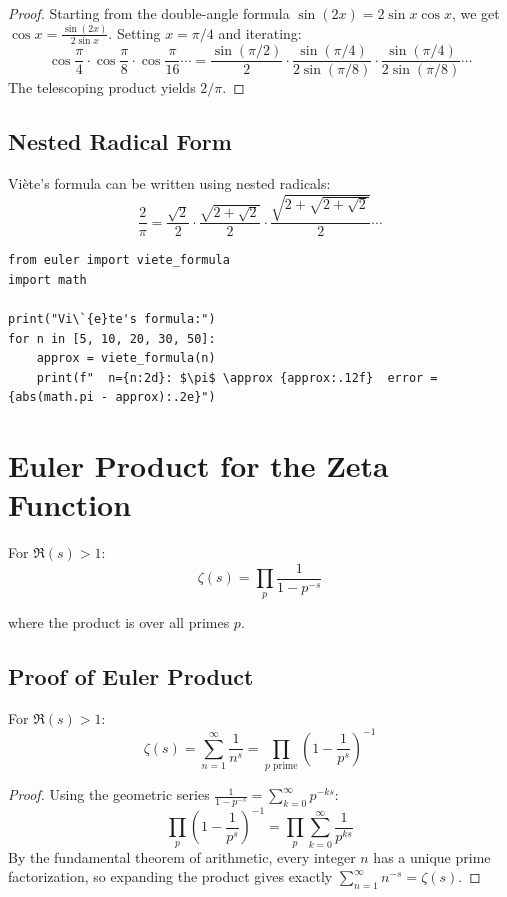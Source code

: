 \begin{proof}
Starting from the double-angle formula $\sin(2x) = 2\sin x \cos x$, we get
$\cos x = \frac{\sin(2x)}{2\sin x}$. Setting $x = \pi/4$ and iterating:
\[
\cos\frac{\pi}{4} \cdot \cos\frac{\pi}{8} \cdot \cos\frac{\pi}{16} \cdots
= \frac{\sin(\pi/2)}{2} \cdot \frac{\sin(\pi/4)}{2\sin(\pi/8)} \cdot \frac{\sin(\pi/4)}{2\sin(\pi/8)} \cdots
\]
The telescoping product yields $2/\pi$.
\end{proof}

\subsection{Nested Radical Form}

Vi\`{e}te's formula can be written using nested radicals:
\[
\frac{2}{\pi} = \frac{\sqrt{2}}{2} \cdot \frac{\sqrt{2+\sqrt{2}}}{2} \cdot \frac{\sqrt{2+\sqrt{2+\sqrt{2}}}}{2} \cdots
\]

\begin{lstlisting}[caption={Vi\`{e}te's formula for $\pi$}, label=lst:viete]
from euler import viete_formula
import math

print("Vi\`{e}te's formula:")
for n in [5, 10, 20, 30, 50]:
    approx = viete_formula(n)
    print(f"  n={n:2d}: $\pi$ \approx {approx:.12f}  error = {abs(math.pi - approx):.2e}")
\end{lstlisting}

\section{Euler Product for the Zeta Function}

For $\Re(s) > 1$:
\[
\zeta(s) = \prod_{p} \frac{1}{1 - p^{-s}}
\]

where the product is over all primes $p$.

\subsection{Proof of Euler Product}

\begin{theorem}
For $\Re(s) > 1$:
\[
\zeta(s) = \sum_{n=1}^{\infty} \frac{1}{n^s} = \prod_{p \text{ prime}} \left(1 - \frac{1}{p^s}\right)^{-1}
\]
\end{theorem}

\begin{proof}
Using the geometric series $\frac{1}{1 - p^{-s}} = \sum_{k=0}^{\infty} p^{-ks}$:
\[
\prod_{p} \left(1 - \frac{1}{p^s}\right)^{-1} = \prod_{p} \sum_{k=0}^{\infty} \frac{1}{p^{ks}}
\]
By the fundamental theorem of arithmetic, every integer $n$ has a unique prime factorization,
so expanding the product gives exactly $\sum_{n=1}^{\infty} n^{-s} = \zeta(s)$.
\end{proof}

